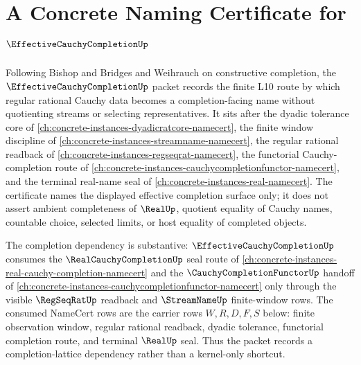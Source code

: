 \chapter{A Concrete Naming Certificate for $\EffectiveCauchyCompletionUp$}
\label{ch:concrete-instances-effective-cauchy-completion-namecert}

Following Bishop and Bridges and Weihrauch on constructive completion, the $\EffectiveCauchyCompletionUp$ packet records the finite L10 route by which regular rational Cauchy data becomes a completion-facing name without quotienting streams or selecting representatives. It sits after the dyadic tolerance core of \autoref{ch:concrete-instances-dyadicratcore-namecert}, the finite window discipline of \autoref{ch:concrete-instances-streamname-namecert}, the regular rational readback of \autoref{ch:concrete-instances-regseqrat-namecert}, the functorial Cauchy-completion route of \autoref{ch:concrete-instances-cauchycompletionfunctor-namecert}, and the terminal real-name seal of \autoref{ch:concrete-instances-real-namecert}. The certificate names the displayed effective completion surface only; it does not assert ambient completeness of $\RealUp$, quotient equality of Cauchy names, countable choice, selected limits, or host equality of completed objects.

The completion dependency is substantive: $\EffectiveCauchyCompletionUp$ consumes the $\RealCauchyCompletionUp$ seal route of \autoref{ch:concrete-instances-real-cauchy-completion-namecert} and the $\CauchyCompletionFunctorUp$ handoff of \autoref{ch:concrete-instances-cauchycompletionfunctor-namecert} only through the visible $\RegSeqRatUp$ readback and $\StreamNameUp$ finite-window rows. The consumed NameCert rows are the carrier rows $W,R,D,F,S$ below: finite observation window, regular rational readback, dyadic tolerance, functorial completion route, and terminal $\RealUp$ seal. Thus the packet records a completion-lattice dependency rather than a kernel-only shortcut.

